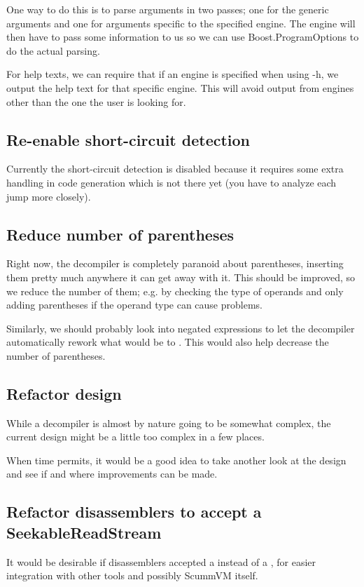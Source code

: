 One way to do this is to parse arguments in two passes; one for the generic arguments and one for arguments specific to the specified engine. The engine will then have to pass some information to us so we can use Boost.ProgramOptions to do the actual parsing.

For help texts, we can require that if an engine is specified when using -h, we output the help text for that specific engine. This will avoid output from engines other than the one the user is looking for.

\subsection{Re-enable short-circuit detection}
Currently the short-circuit detection is disabled because it requires some extra handling in code generation which is not there yet (you have to analyze each jump more closely).

\subsection{Reduce number of parentheses}
Right now, the decompiler is completely paranoid about parentheses, inserting them pretty much anywhere it can get away with it. This should be improved, so we reduce the number of them; e.g. by checking the type of operands and only adding parentheses if the operand type can cause problems.

Similarly, we should probably look into negated expressions to let the decompiler automatically rework what would be  to . This would also help decrease the number of parentheses.

\subsection{Refactor design}
While a decompiler is almost by nature going to be somewhat complex, the current design might be a little too complex in a few places.

When time permits, it would be a good idea to take another look at the design and see if and where improvements can be made.

\subsection{Refactor disassemblers to accept a SeekableReadStream}
It would be desirable if disassemblers accepted a  instead of a , for easier integration with other tools and possibly ScummVM itself.

